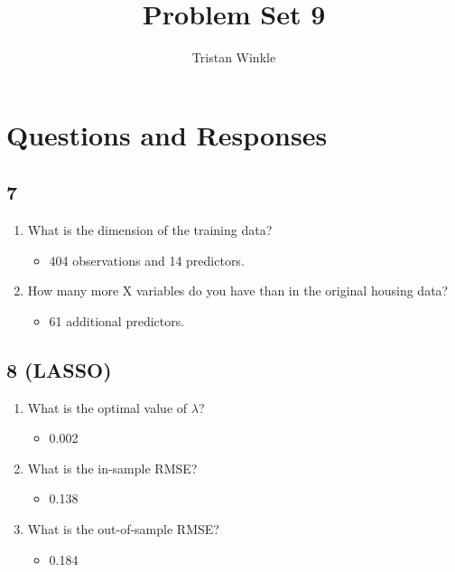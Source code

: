 \documentclass[12pt]{article}
\title{Problem Set 9}
\author{Tristan Winkle}
\date{}
\begin{document}
\maketitle

\section{Questions and Responses}

\subsection*{7}

\begin{enumerate}
    \item What is the dimension of the training data?
        \begin{itemize}
            \item[--]  404 observations and 14 predictors. 
        \end{itemize}

    \item How many more X variables do you have than in the original housing data?
        \begin{itemize}
            \item[--]  61 additional predictors.
        \end{itemize}

\end{enumerate}

\subsection*{8 (LASSO)}

\begin{enumerate}
    \item What is the optimal value of $\lambda$?
        \begin{itemize}
            \item[--]  0.002
        \end{itemize}

    \item What is the in-sample RMSE?
        \begin{itemize}
            \item[--]  0.138
        \end{itemize}

    \item What is the out-of-sample RMSE?
        \begin{itemize}
            \item[--]  0.184
        \end{itemize}
\end{enumerate}
\end{document}

